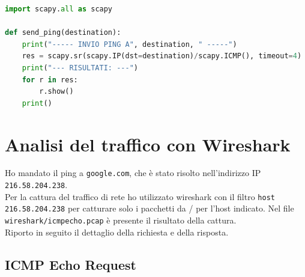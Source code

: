 \documentclass[12pt,a4paper]{report}
\begin{document}
\begin{lstlisting}[language=Python, caption={Funzione python per la generazione di un pacchetto \texttt{ICMP Echo Request}}, label={code:icmp}]
import scapy.all as scapy

def send_ping(destination):
    print("----- INVIO PING A", destination, " -----")
    res = scapy.sr(scapy.IP(dst=destination)/scapy.ICMP(), timeout=4) 
    print("--- RISULTATI: ---")
    for r in res:
        r.show()
    print()
\end{lstlisting}

\section{Analisi del traffico con Wireshark}
Ho mandato il ping a \texttt{google.com}, che è stato risolto nell'indirizzo IP \texttt{216.58.204.238}.\\
Per la cattura del traffico di rete ho utilizzato wireshark con il filtro \texttt{host 216.58.204.238} per catturare solo i pacchetti da / per l'host indicato. Nel file \texttt{wireshark/icmp{\textunderscore}echo.pcap} è presente il risultato della cattura. \\
Riporto in seguito il dettaglio della richiesta e della risposta.

\subsection{ICMP Echo Request}
\label{subsection:ICMPEchoRequest}
\end{document}
